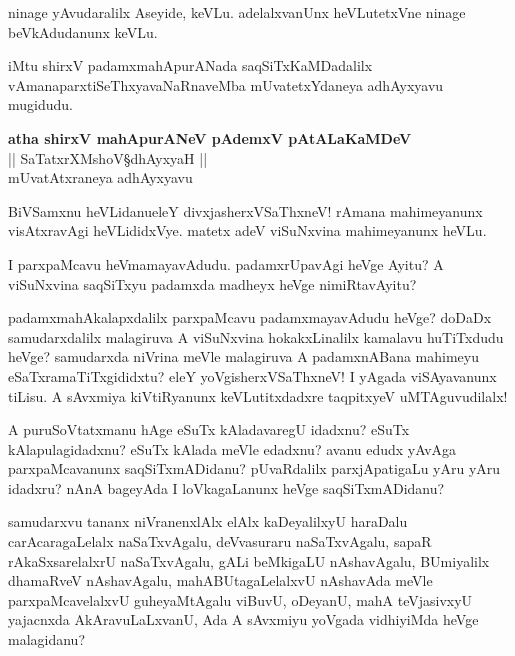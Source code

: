 \begin{mng}
ninage yAvudaralilx Aseyide, keVLu. adelalxvanUnx heVLutetxVne ninage beVkAdudanunx keVLu.
\end{mng}
iMtu shirxV padamxmahApurANada saqSiTxKaMDadalilx vAmanaparxtiSeThxyavaNaRnaveMba mUvatetxYdaneya adhAyxyavu mugidudu.

\begin{center}
\textbf{\Large atha shirxV mahApurANeV pAdemxV pAtALaKaMDeV}\\
|| SaTatxrXMshoV\S dhAyxyaH ||\\[20pt]
mUvatAtxraneya adhAyxyavu
\end{center}

\begin{mng}
BiVSamxnu heVLidanu\mdash eleY divxjasherxVSaThxneV! rAmana mahimeyanunx visAtxravAgi heVLididxVye. matetx adeV viSuNxvina mahimeyanunx heVLu.
\end{mng}

\begin{mng}
I parxpaMcavu heVmamayavAdudu. padamxrUpavAgi heVge Ayitu? A viSuNxvina saqSiTxyu padamxda madheyx heVge nimiRtavAyitu?
\end{mng}

\begin{mng}
padamxmahAkalapxdalilx parxpaMcavu padamxmayavAdudu heVge? doDaDx samudarxdalilx malagiruva A viSuNxvina hokakxLinalilx kamalavu huTiTxdudu heVge? samudarxda niVrina meVle malagiruva A padamxnABana mahimeyu eSaTxramaTiTxgididxtu? eleY yoVgisherxVSaThxneV! I yAgada viSAyavanunx tiLisu. A sAvxmiya kiVtiRyanunx keVLutitxdadxre taqpitxyeV uMTAguvudilalx!
\end{mng}

\begin{mng}
A puruSoVtatxmanu hAge eSuTx kAladavaregU idadxnu? eSuTx kAlapulagidadxnu? eSuTx kAlada meVle edadxnu? avanu edudx yAvAga parxpaMcavanunx saqSiTxmADidanu? pUvaRdalilx parxjApatigaLu yAru yAru idadxru? nAnA bageyAda I loVkagaLanunx heVge saqSiTxmADidanu?
\end{mng}

\begin{mng}
samudarxvu tananx niVranenxlAlx elAlx kaDeyalilxyU haraDalu carAcaragaLelalx naSaTxvAgalu, deVvasuraru naSaTxvAgalu, sapaR rAkaSxsarelalxrU naSaTxvAgalu, gALi beMkigaLU nAshavAgalu, BUmiyalilx dhamaRveV nAshavAgalu, mahABUtagaLelalxvU nAshavAda meVle parxpaMcavelalxvU guheyaMtAgalu viBuvU, oDeyanU, mahA teVjasivxyU yajacnxda AkAravuLaLxvanU, Ada A sAvxmiyu yoVgada vidhiyiMda heVge malagidanu?
\end{mng}

